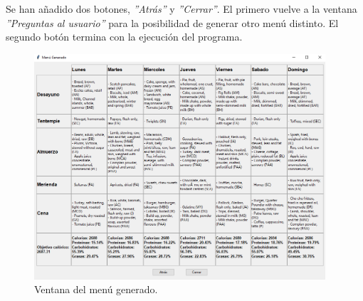 Se han añadido dos botones, \textit{''Atrás''} y \textit{''Cerrar''}. El primero vuelve a la ventana \textit{''Preguntas al usuario''} para la posibilidad de generar otro menú distinto. El segundo botón termina con la ejecución del programa.

\begin{figure}[H]
    \centering
    \includegraphics[width=0.965\textwidth]{figures/ventana-menu.png}
    \caption{Ventana del menú generado.}
    \label{fig:ventana-menu}
\end{figure}